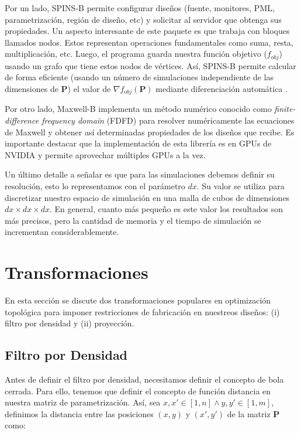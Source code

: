 Por un lado, SPINS-B permite configurar diseños (fuente, monitores, PML, parametrización, región de diseño, etc) y solicitar al servidor que obtenga sus propiedades.
Un aspecto interesante de este paquete es que trabaja con bloques llamados nodos.
Estos representan operaciones fundamentales como suma, resta, multiplicación, etc.
Luego, el programa guarda nuestra función objetivo ($f_{obj}$) usando un grafo que tiene estos nodos de vértices.
Así, SPINS-B permite calcular de forma eficiente
(usando un número de simulaciones independiente de las dimensiones de $\boldsymbol{P}$) 
el valor de $\nabla f_{obj}(\boldsymbol{P})$ mediante diferenciación automática \citep{Su2020, Mykel2019}.

Por otro lado, Maxwell-B implementa un método numérico conocido como \emph{finite-difference frequency domain}
(FDFD) para resolver numéricamente las ecuaciones de Maxwell y obtener así determinadas propiedades
de los diseños que recibe.
Es importante destacar que la implementación de esta librería es en GPUs de NVIDIA y permite
aprovechar múltiples GPUs a la vez.


Un último detalle a señalar es que para las simulaciones debemos definir su resolución,
esto lo representamos con el parámetro $dx$. 
Su valor se utiliza para discretizar nuestro espacio de
simulación en una malla de cubos de dimensiones $dx \times dx \times dx$.
En general, cuanto más pequeño es este valor
los resultados son más precisos, pero la cantidad de memoria y el tiempo de
simulación se incrementan considerablemente.

\section{Transformaciones}\label{sec:transformations}

En esta sección se discute dos transformaciones populares en optimización topológica
para imponer restricciones de fabricación en nuestreos diseños: (i) filtro por densidad y
(ii) proyección.

\subsection{Filtro por Densidad}

Antes de definir el filtro por densidad, necesitamos definir el concepto de bola cerrada.
Para ello, tenemos que definir el concepto de función distancia en nuestra matriz
de parametrización. Así, sea $x, x' \in [1, n] \land y, y' \in [1, m]$, definimos 
la distancia entre las posiciones $(x, y)$ y $(x', y')$ de la matriz $\boldsymbol{P}$ como:

